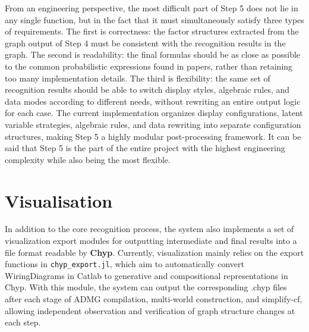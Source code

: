 \documentclass[a4paper]{report}
\begin{document}
From an engineering perspective, the most difficult part of Step 5 does not lie in any single function, but in the fact that it must simultaneously satisfy three types of requirements. The first is correctness: the factor structures extracted from the graph output of Step 4 must be consistent with the recognition results in the graph. The second is readability: the final formulas should be as close as possible to the common probabilistic expressions found in papers, rather than retaining too many implementation details. The third is flexibility: the same set of recognition results should be able to switch display styles, algebraic rules, and data modes according to different needs, without rewriting an entire output logic for each case. The current implementation organizes display configurations, latent variable strategies, algebraic rules, and data rewriting into separate configuration structures, making Step 5 a highly modular post-processing framework. It can be said that Step 5 is the part of the entire project with the highest engineering complexity while also being the most flexible. 


\section{Visualisation}
In addition to the core recognition process, the system also implements a set of visualization export modules for outputting intermediate and final results into a file format readable by \textbf{Chyp}. Currently, visualization mainly relies on the export functions in \texttt{chyp\_export.jl}, which aim to automatically convert WiringDiagrams in Catlab to generative and compositional representations in Chyp. With this module, the system can output the corresponding .chyp files after each stage of ADMG compilation, multi-world construction, and simplify-cf, allowing independent observation and verification of graph structure changes at each step.
\end{document}
